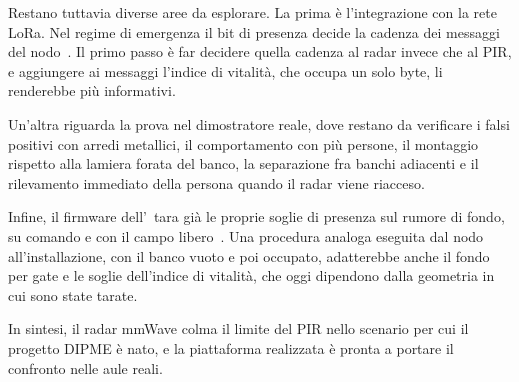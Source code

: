 Restano tuttavia diverse aree da esplorare. La prima è l'integrazione con la rete LoRa. Nel regime di emergenza il bit di presenza decide la cadenza dei messaggi del nodo~\cite{callisto2026dipme}. Il primo passo è far decidere quella cadenza al radar invece che al PIR, e aggiungere ai messaggi l'indice di vitalità, che occupa un solo byte, li renderebbe più informativi.

Un'altra riguarda la prova nel dimostratore reale, dove restano da verificare i falsi positivi con arredi metallici, il comportamento con più persone, il montaggio rispetto alla lamiera forata del banco, la separazione fra banchi adiacenti e il rilevamento immediato della persona quando il radar viene riacceso.

Infine, il firmware dell'\ldb\ tara già le proprie soglie di presenza sul rumore di fondo, su comando e con il campo libero~\cite{hilinkV244}. Una procedura analoga eseguita dal nodo all'installazione, con il banco vuoto e poi occupato, adatterebbe anche il fondo per gate e le soglie dell'indice di vitalità, che oggi dipendono dalla geometria in cui sono state tarate.

In sintesi, il radar mmWave colma il limite del PIR nello scenario per cui il progetto DIPME è nato, e la piattaforma realizzata è pronta a portare il confronto nelle aule reali.
